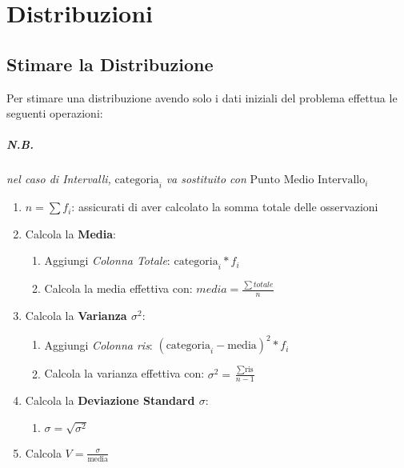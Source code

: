 \chapter{Distribuzioni}

\section{Stimare la Distribuzione}\label{stimare-distribuzione}

Per stimare una distribuzione avendo solo i dati iniziali del problema effettua
le seguenti operazioni:


\paragraph{N.B.} \textit{nel caso di Intervalli,} $\text{categoria}_i$ \textit{va sostituito con}
$\text{Punto Medio Intervallo}_i$

\begin{enumerate}
      \item $n = \sum{f_i}$: assicurati di aver calcolato la somma totale delle
            osservazioni
      \item Calcola la \textbf{Media}: \begin{enumerate}
                  \item Aggiungi \textit{Colonna Totale}: $\text{categoria}_i * f_i$
                  \item Calcola la media effettiva con: $media = \frac{\sum
                                    totale}{n}$
            \end{enumerate}
      \item Calcola la \textbf{Varianza $\sigma^2$}: \begin{enumerate}
                  \item Aggiungi \textit{Colonna ris}: $(\text{categoria}_i -
                              \text{media})^2 * f_i$
                  \item Calcola la varianza effettiva con: $\sigma^2 = \frac{\sum
                                    \text{ris}}{n -1}$
            \end{enumerate}
      \item Calcola la \textbf{Deviazione Standard $\sigma$}: \begin{enumerate}
                  \item $\sigma = \sqrt{\sigma^2}$
            \end{enumerate}
      \item Calcola $V = \frac{\sigma}{\text{media}}$
\end{enumerate}

